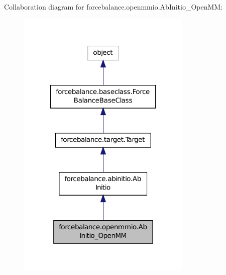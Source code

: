 Collaboration diagram for forcebalance.\-openmmio.\-Ab\-Initio\-\_\-\-Open\-M\-M\-:\nopagebreak
\begin{figure}[H]
\begin{center}
\leavevmode
\includegraphics[width=236pt]{classforcebalance_1_1openmmio_1_1AbInitio__OpenMM__coll__graph}
\end{center}
\end{figure}
